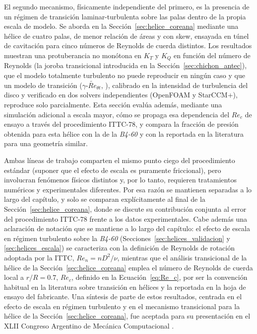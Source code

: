 El segundo mecanismo, físicamente independiente del primero, es la presencia de un régimen de transición laminar-turbulenta sobre las palas dentro de la propia escala de modelo. Se aborda en la Sección~\ref{sec:helice_coreana} mediante una hélice de cuatro palas, de menor relación de áreas y con skew, ensayada en túnel de cavitación para cinco números de Reynolds de cuerda distintos. Los resultados muestran una protuberancia no monótona en $K_T$ y $K_Q$ en función del número de Reynolds (la joroba transicional introducida en la Sección~\ref{sec:chichon_antec}), que el modelo totalmente turbulento no puede reproducir en ningún caso y que un modelo de transición ($\gamma$-$\widetilde{Re}_{\theta t}$, \citealp{langtry2009}), calibrado en la intensidad de turbulencia del disco y verificado en dos solvers independientes (OpenFOAM y StarCCM+), reproduce solo parcialmente. Esta sección evalúa además, mediante una simulación adicional a escala mayor, cómo se propaga esa dependencia del $Re_c$ de ensayo a través del procedimiento ITTC-78, y compara la fracción de presión obtenida para esta hélice con la de la \textit{B4-60} y con la reportada en la literatura para una geometría similar.

Ambas líneas de trabajo comparten el mismo punto ciego del procedimiento estándar (suponer que el efecto de escala es puramente friccional), pero involucran fenómenos físicos distintos y, por lo tanto, requieren tratamientos numéricos y experimentales diferentes. Por esa razón se mantienen separadas a lo largo del capítulo, y solo se comparan explícitamente al final de la Sección~\ref{sec:helice_coreana}, donde se discute su contribución conjunta al error del procedimiento ITTC-78 frente a los datos experimentales. Cabe además una aclaración de notación que se mantiene a lo largo del capítulo: el efecto de escala en régimen turbulento sobre la \textit{B4-60} (Secciones~\ref{sec:helices_validacion} y \ref{sec:helices_escala}) se caracteriza con la definición de Reynolds de rotación adoptada por la ITTC, $Re_n = nD^2/\nu$, mientras que el análisis transicional de la hélice de la Sección~\ref{sec:helice_coreana} emplea el número de Reynolds de cuerda local a $r/R=0.7$, $Re_c$, definido en la Ecuación~\ref{eq:Re_c}, por ser la convención habitual en la literatura sobre transición en hélices y la reportada en la hoja de ensayo del fabricante. Una síntesis de parte de estos resultados, centrada en el efecto de escala en régimen turbulento y en el mecanismo transicional para la hélice de la Sección~\ref{sec:helice_coreana}, fue aceptada para su presentación en el XLII Congreso Argentino de Mecánica Computacional \citep{oyuela2026mecom}.

